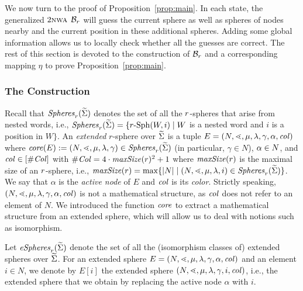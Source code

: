 \documentclass{LMCS}
\begin{document}
We now turn to the proof of Proposition~\ref{prop:main}. In each state, the
generalized $2\textsc{nwa}$ $\mathcal{B}_r$ will guess the current sphere as well as
spheres of nodes nearby and the current position in these additional spheres.
Adding some global information allows us to locally check whether all the
guesses are correct. The rest of this section is devoted to the construction
of $\mathcal{B}_r$ and a corresponding mapping $\eta$ to prove
Proposition~\ref{prop:main}.

\subsubsection{The Construction}

Recall that $\mathit{Spheres}_r(\widetilde{\Sigma})$ denotes the set of all the
$r$-spheres that arise from nested words, i.e.,
$\mathit{Spheres}_r(\widetilde{\Sigma}) = \{r\text{-}\mathrm{Sph}(W,i) \mid W$ is a nested
word and $i$ is a position in $W\}$. An \emph{extended} $r$-sphere over
$\widetilde{\Sigma}$ is a tuple $E=(N,\mathord{\lessdot},\mu,\lambda,\gamma,\alpha,\mathit{col})$
where $\mathit{core}(E) := (N,\mathord{\lessdot},\mu,\lambda,\gamma) \in
\mathit{Spheres}_r(\widetilde{\Sigma})$ (in particular, $\gamma \in N$), $\alpha \in
N$, and $\mathit{col} \in [\#\mathit{Col}]$ with $\#\mathit{Col} = 4 \cdot \mathit{maxSize}(r)^2 + 1$ where
$\mathit{maxSize}(r)$ is the maximal size of an $r$-sphere, i.e., $\mathit{maxSize}(r) = \max\{|N|
\mid (N,\mathord{\lessdot},\mu,\lambda,i) \in \mathit{Spheres}_r(\widetilde{\Sigma})\}$. We say
that $\alpha$ is the \emph{active node} of $E$ and $\mathit{col}$ is its
\emph{color}. Strictly speaking,
$(N,\mathord{\lessdot},\mu,\lambda,\gamma,\alpha,\mathit{col})$ is not a mathematical
structure, as $\mathit{col}$ does not refer to an element of $N$. We introduced the
function $\mathit{core}$ to extract a mathematical structure from an extended sphere,
which will allow us to deal with notions such as isomorphism.

Let $\mathit{eSpheres}_r(\widetilde{\Sigma})$ denote the set of all the (isomorphism
classes of) extended spheres over $\widetilde{\Sigma}$. For an extended sphere
$E=(N,\mathord{\lessdot},\mu,\lambda,\gamma,\alpha,\mathit{col})$ and an element $i \in N$, we
denote by $E[i]$ the extended sphere
$(N,\mathord{\lessdot},\mu,\lambda,\gamma,i,\mathit{col})$, i.e., the extended sphere that we
obtain by replacing the active node $\alpha$ with $i$.
\end{document}
